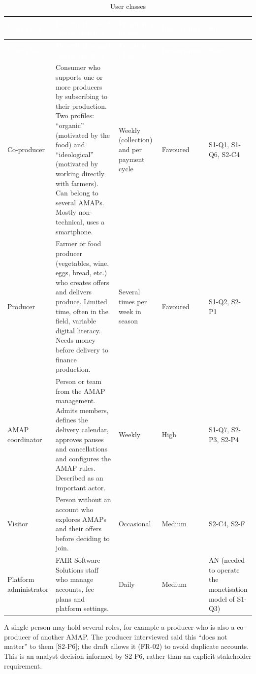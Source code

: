 \documentclass[11pt,a4paper]{article}
\begin{document}
{\footnotesize
\begin{longtable}{>{\raggedright\arraybackslash\hspace{0pt}}p{}>{\raggedright\arraybackslash\hspace{0pt}}p{}>{\raggedright\arraybackslash\hspace{0pt}}p{}>{\raggedright\arraybackslash\hspace{0pt}}p{}>{\raggedright\arraybackslash\hspace{0pt}}p{}}
\caption{User classes}\\
\rowcolor{hdr}\textcolor{white}{\textbf{User class}} & \textcolor{white}{\textbf{Description and characteristics}} & \textcolor{white}{\textbf{Frequency of use}} & \textcolor{white}{\textbf{Importance}} & \textcolor{white}{\textbf{Source}} \\ \endfirsthead
\rowcolor{hdr}\textcolor{white}{\textbf{User class}} & \textcolor{white}{\textbf{Description and characteristics}} & \textcolor{white}{\textbf{Frequency of use}} & \textcolor{white}{\textbf{Importance}} & \textcolor{white}{\textbf{Source}} \\ \endhead
Co-producer & Consumer who supports one or more producers by subscribing to their production. Two profiles: ``organic'' (motivated by the food) and ``ideological'' (motivated by working directly with farmers). Can belong to several AMAPs. Mostly non-technical, uses a smartphone. & Weekly (collection) and per payment cycle & Favoured & S1-Q1, S1-Q6, S2-C4 \\ \hline
Producer & Farmer or food producer (vegetables, wine, eggs, bread, etc.) who creates offers and delivers produce. Limited time, often in the field, variable digital literacy. Needs money before delivery to finance production. & Several times per week in season & Favoured & S1-Q2, S2-P1 \\ \hline
AMAP coordinator & Person or team from the AMAP management. Admits members, defines the delivery calendar, approves pauses and cancellations and configures the AMAP rules. Described as an important actor. & Weekly & High & S1-Q7, S2-P3, S2-P4 \\ \hline
Visitor & Person without an account who explores AMAPs and their offers before deciding to join. & Occasional & Medium & S2-C4, S2-F \\ \hline
Platform administrator & FAIR Software Solutions staff who manage accounts, fee plans and platform settings. & Daily & Medium & AN (needed to operate the monetisation model of S1-Q3) \\ \hline
\end{longtable}}
A single person may hold several roles, for example a producer who is also a co-producer of another AMAP. The producer interviewed said this ``does not matter'' to them [S2-P6]; the draft allows it (FR-02) to avoid duplicate accounts. This is an analyst decision informed by S2-P6, rather than an explicit stakeholder requirement.
\end{document}
